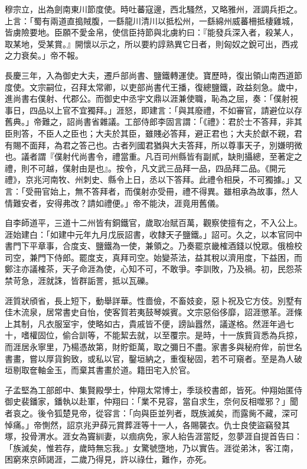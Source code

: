 \begin{pinyinscope}
 穆宗立，出為劍南東川節度使。時吐蕃寇邊，西北騷然，又略雅州，涯調兵拒之。上言：「蜀有兩道直搗賊腹，一繇龍川清川以抵松州，一繇綿州威蕃柵抵棲雞城，皆虜險要地。臣願不愛金帛，使信臣持節與北虜約曰：『能發兵深入者，殺某人，取某地，受某賞。』開懷以示之，所以要約諄熟異它日者，則匈奴之銳可出，西戎之力衰矣。」帝不報。



 長慶三年，入為御史大夫，遷戶部尚書、鹽鐵轉運使。寶歷時，復出領山南西道節度使。文宗嗣位，召拜太常卿，以吏部尚書代王播，復總鹽鐵，政益刻急。歲中，進尚書右僕射、代郡公。而御史中丞宇文鼎以涯兼使職，恥為之屈，奏：「僕射視事日，四品以上官不宜獨拜。」涯怒，即建言：「與其廢禮，不如審官，請避位以存舊典。」帝難之，詔尚書省雜議。工部侍郎李固言謂：「《禮》：君於士不答拜，非其臣則答，不臣人之臣也；大夫於其臣，雖賤必答拜，避正君也；大夫於獻不親，君有賜不面拜，為君之答己也。古者列國君猶與大夫答拜，所以尊事天子，別嫌明微也。議者謂『僕射代尚書令，禮當重。凡百司州縣皆有副貳，缺則攝總，至著定之禮，則不可越，僕射由是也』。按令，凡文武三品拜一品，四品拜二品。《開元禮》，京兆河南牧、州刺史、縣令上日，丞以下答拜。此禮令相戾，不可獨據。」又言：「受冊官始上，無不答拜者，而僕射亦受冊，禮不得異。雖相承為故事，然人情難安者，安得弗改？請如禮便。」帝不能決，涯竟用舊儀。



 自李師道平，三道十二州皆有銅鐵官，歲取冶賦百萬，觀察使擅有之，不入公上。涯始建白：「如建中元年九月戊辰詔書，收隸天子鹽鐵。」詔可。久之，以本官同中書門下平章事，合度支、鹽鐵為一使，兼領之。乃奏罷京畿榷酒錢以悅眾。俄檢校司空，兼門下侍郎。罷度支，真拜司空。始變茶法，益其稅以濟用度，下益困，而鄭注亦議榷茶，天子命涯為使，心知不可，不敢爭。李訓敗，乃及禍。初，民怨茶禁苛急，涯就誅，皆群詬詈，抵以瓦礫。



 涯質狀頎省，長上短下，動舉詳華。性嗇儉，不畜妓妾，惡卜祝及它方伎。別墅有佳木流泉，居常書史自怡，使客賀若夷鼓琴娛賓。文宗惡俗侈靡，詔涯懲革。涯條上其制，凡衣服室宇，使略如古，貴戚皆不便，謗訕囂然，議遂格。然涯年過七十，嗜權固位，偷合訓等，不能絜去就，以至覆宗。是時，十一族貲貨悉為兵掠，而涯居永寧里，乃楊憑故第，財貯鉅萬，取之彌日不盡。家書多與秘府侔，前世名書畫，嘗以厚貨鉤致，或私以官，鑿垣納之，重復秘固，若不可窺者。至是為人破垣剔取奩軸金玉，而棄其書畫於道。籍田宅入於官。



 子孟堅為工部郎中、集賢殿學士，仲翔太常博士，季琰校書郎，皆死。仲翔始匿侍御史裴鐇家，鐇執以赴軍，仲翔曰：「業不見容，當自求生，奈何反相噬邪？」聞者哀之。後令狐楚見帝，從容言：「向與臣並列者，既族滅矣，而露胔不藏，深可悼痛。」帝惻然，詔京兆尹薛元賞葬涯等十一人，各賜襲衣。仇士良使盜竊發其塚，投骨渭水。涯女為竇紃妻，以痼病免，家人紿告涯當貶，忽夢涯自提首告曰：「族滅矣，惟若存，歲時無忘我。」女驚號墮地，乃以實告。涯從弟沐，客江南，困窮來京師謁涯，二歲乃得見，許以祿仕，難作，亦死。




\end{pinyinscope}
